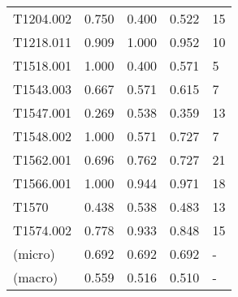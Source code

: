 \begin{tabular}{lrrrl}
    T1204.002 & 0.750 & 0.400 & 0.522 & 15  \\
    T1218.011 & 0.909 & 1.000 & 0.952 & 10  \\
    T1518.001 & 1.000 & 0.400 & 0.571 & 5   \\
    T1543.003 & 0.667 & 0.571 & 0.615 & 7   \\
    T1547.001 & 0.269 & 0.538 & 0.359 & 13  \\
    T1548.002 & 1.000 & 0.571 & 0.727 & 7   \\
    T1562.001 & 0.696 & 0.762 & 0.727 & 21  \\
    T1566.001 & 1.000 & 0.944 & 0.971 & 18  \\
    T1570     & 0.438 & 0.538 & 0.483 & 13  \\
    T1574.002 & 0.778 & 0.933 & 0.848 & 15 \\
    (micro)   & 0.692 & 0.692 & 0.692 & - \\
    (macro)   & 0.559 & 0.516 & 0.510 & -   \\
    \bottomrule
\end{tabular}
